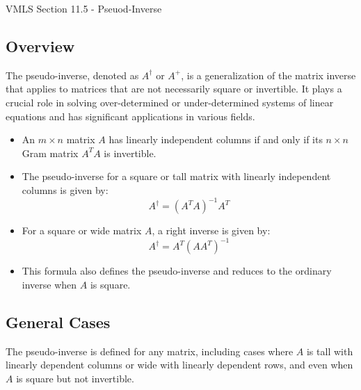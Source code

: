 \begin{notes}{VMLS Section 11.5 - Pseuod-Inverse}
    \subsection*{Overview}
    The pseudo-inverse, denoted as $A^\dagger$ or $A^+$, is a generalization of the matrix inverse that applies to matrices that are not necessarily square or invertible. It plays a crucial role in 
    solving over-determined or under-determined systems of linear equations and has significant applications in various fields. \vspace*{1em}
    
    \begin{highlight}
        \begin{itemize}
            \item An $m \times n$ matrix $A$ has linearly independent columns if and only if its $n \times n$ Gram matrix $A^T A$ is invertible.
            \item The pseudo-inverse for a square or tall matrix with linearly independent columns is given by:
            \begin{equation*}
                A^\dagger = (A^T A)^{-1}A^T
            \end{equation*}
        \end{itemize}
    \end{highlight}
    
    \begin{highlight}
        \begin{itemize}
            \item For a square or wide matrix $A$, a right inverse is given by:
            \begin{equation*}
                A^\dagger = A^T (A A^T)^{-1}
            \end{equation*}
            \item This formula also defines the pseudo-inverse and reduces to the ordinary inverse when $A$ is square.
        \end{itemize}
    \end{highlight}
    
    \subsection*{General Cases}
    The pseudo-inverse is defined for any matrix, including cases where $A$ is tall with linearly dependent columns or wide with linearly dependent rows, and even when $A$ is square but not invertible.
    

\end{notes}
